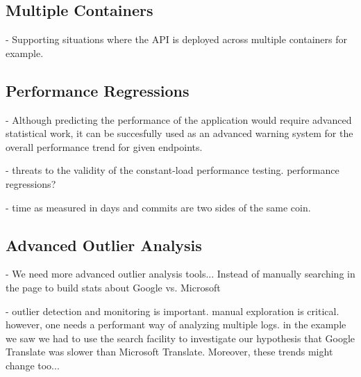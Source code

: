 



  \subsection*{Multiple Containers}

  -   Supporting situations where the API is deployed across multiple containers for example.


  \subsection*{Performance Regressions}

    - Although predicting the performance of the application would require advanced statistical work, it can be succesfully used as an advanced warning system for the overall performance trend for given endpoints.

    - threats to the validity of the constant-load performance testing. performance regressions? 


    - time as measured in days and commits are two sides of the same coin. 


  \subsection*{Advanced Outlier Analysis}

    - We need more advanced outlier analysis tools... Instead of manually searching in the page to build stats about Google vs. Microsoft

    - outlier detection and monitoring is important. manual exploration is critical. however, one needs a performant way of analyzing multiple logs. in the example we saw we had to use the search facility to investigate our hypothesis that Google Translate was slower than Microsoft Translate. Moreover, these trends might change too... 





